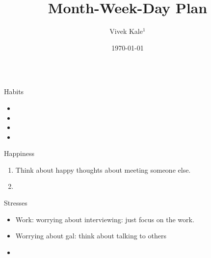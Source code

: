 \documentclass[serif, mathserif, final]{beamer}
\title{Month-Week-Day Plan}
\author{Vivek Kale$^1$}
\institute{$^1$ University of Illinois at Urbana-Champaign}
\date{\today}
\begin{document}
    

\begin{frame}{}
  \begin{columns}
    \begin{column}{0.25\linewidth} %
      \begin{block}{Habits}
        \begin{itemize}
          \tiny \item \tiny 
        \item \tiny 
        \item \tiny 
        \item \tiny 
        \end{itemize}
      \end{block}
      \begin{block}{Happiness} 
        \begin{enumerate}
          \tiny \item \tiny Think about happy thoughts about meeting
          someone else.  
        \item \tiny 
        \end{enumerate}
      \end{block} 

      \begin{block}{Stresses}
        \begin{itemize}
        \item \tiny Work: worrying about interviewing: just
          focus on the work. 
        \item \tiny Worrying about gal: think about talking to
          others 
        \item \tiny 
        \end{itemize}
      \end{block}


\end{column}
\end{columns}
\end{frame}
\end{document}
